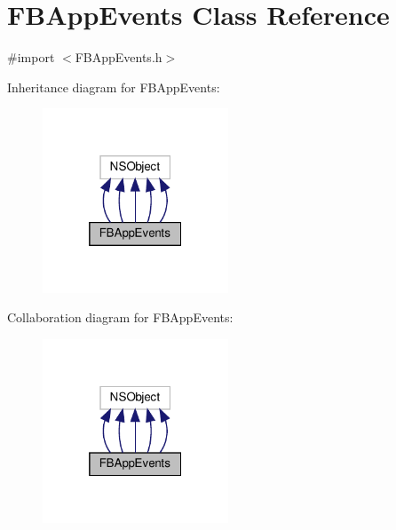 \hypertarget{interfaceFBAppEvents}{}\section{F\+B\+App\+Events Class Reference}
\label{interfaceFBAppEvents}


{\ttfamily \#import $<$F\+B\+App\+Events.\+h$>$}



Inheritance diagram for F\+B\+App\+Events\+:
\nopagebreak
\begin{figure}[H]
\begin{center}
\leavevmode
\includegraphics[width=157pt]{interfaceFBAppEvents__inherit__graph}
\end{center}
\end{figure}


Collaboration diagram for F\+B\+App\+Events\+:
\nopagebreak
\begin{figure}[H]
\begin{center}
\leavevmode
\includegraphics[width=157pt]{interfaceFBAppEvents__coll__graph}
\end{center}
\end{figure}
